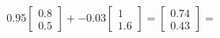 \documentclass[preview]{standalone}
\begin{document}
\begin{align*}
0.95 \begin{bmatrix} 0.8 \\ 0.5 \end{bmatrix} + -0.03 \begin{bmatrix} 1 \\ 1.6 \end{bmatrix} = \begin{bmatrix} 0.74 \\ 0.43 \end{bmatrix} =
\end{align*}
\end{document}
